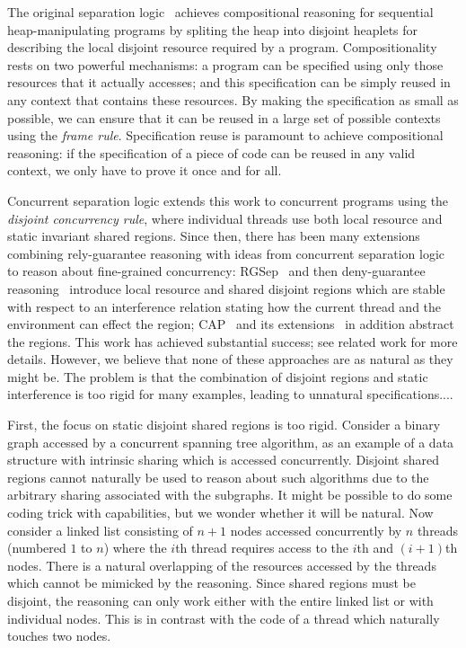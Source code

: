 The original separation logic~\cite{rey02,seplog} achieves
compositional reasoning for sequential heap-manipulating programs by
spliting the heap into disjoint heaplets for describing the local
disjoint resource required by a program. Compositionality rests on two
powerful mechanisms: a program  can be specified using only those
resources that it actually accesses; and this specification can be
simply reused in any context that contains these resources.
By making the specification
as small  as possible, we can ensure that it
can be reused in a large set of possible contexts using  the {\em frame
rule}. 
 Specification reuse is paramount to achieve compositional
reasoning: if the specification of a piece of code can be reused in
any valid context, we only have  to prove it once and for all. 


Concurrent separation logic extends this work to concurrent programs
using the {\em disjoint concurrency rule}, where individual threads
use both local resource and static invariant shared regions. Since
then, there has been many extensions combining rely-guarantee
reasoning with ideas from concurrent separation logic to reason about
fine-grained concurrency: RGSep~\cite{viktor-marriage} and then
deny-guarantee reasoning~\cite{dg} introduce local resource and shared
disjoint regions which are stable with respect to an interference
relation stating how the current thread and the environment can effect
the region; CAP~\cite{cap-ecoop10} and its
extensions~\cite{hocap,icap,tada} in addition abstract the
regions. This work has achieved substantial success; see related work
for more details. However, we believe that none of these approaches
are as natural as they might be.  The problem is that the combination
of disjoint regions and static interference is too rigid for many
examples, leading to unnatural specifications....


First, the focus on static disjoint shared regions is too rigid.
Consider a binary graph accessed by a concurrent spanning tree
algorithm, as an example of a data structure with intrinsic sharing
which is accessed concurrently. Disjoint shared regions cannot
naturally be used to reason about such algorithms due to the arbitrary
sharing associated with the subgraphs. It might be possible to do some
coding trick with capabilities, but we wonder whether it will be
natural. Now consider a linked list consisting of $n+1$ nodes accessed
concurrently by $n$ threads (numbered $1$ to $n$) where the $i$th
thread requires access to the $i$th and $(i+1)$th nodes.  There is a
natural overlapping of the resources accessed by the threads which
cannot be mimicked by the reasoning. Since shared regions must be
disjoint, the reasoning can only work either with the entire linked
list or with individual nodes. This is in contrast with the code of a
thread which naturally touches two nodes.



